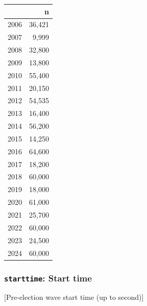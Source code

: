 \documentclass[10pt,article,oneside]{memoir}
\begin{document}
\begin{table}[H]
\centering
\begin{tabular}[t]{lr}
\toprule
 & n\\
\midrule
2006 & 36,421\\
2007 & 9,999\\
2008 & 32,800\\
2009 & 13,800\\
2010 & 55,400\\
2011 & 20,150\\
2012 & 54,535\\
2013 & 16,400\\
2014 & 56,200\\
2015 & 14,250\\
2016 & 64,600\\
2017 & 18,200\\
2018 & 60,000\\
2019 & 18,000\\
2020 & 61,000\\
2021 & 25,700\\
2022 & 60,000\\
2023 & 24,500\\
2024 & 60,000\\
\bottomrule
\end{tabular}
\end{table}

\subsubsection{\texorpdfstring{\texttt{starttime}: Start
time}{starttime: Start time}}\label{starttime-start-time}

{[}Pre-election wave start time (up to second){]}
\end{document}
